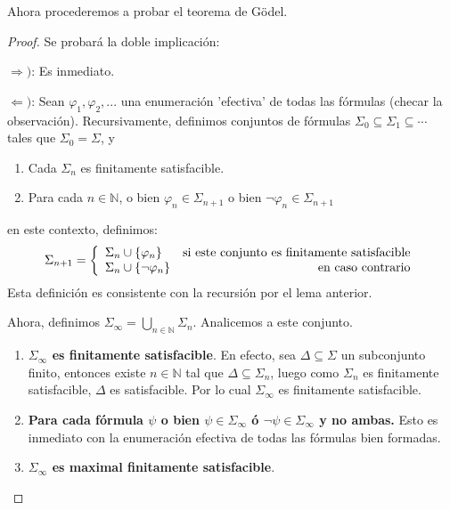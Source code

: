 \documentclass[12pt]{report}
\newcounter{it}
\theoremstyle{largebreak}
\begin{document}
    Ahora procederemos a probar el teorema de Gödel. 

    \begin{proof}
        Se probará la doble implicación:
        
        $\Rightarrow)$: Es inmediato.

        $\Leftarrow)$: Sean $\varphi_1,\varphi_2,...$ una enumeración 'efectiva' de todas las fórmulas (checar la observación). Recursivamente, definimos conjuntos de fórmulas $\Sigma_0\subseteq\Sigma_1\subseteq\cdots$ tales que $\Sigma_0=\Sigma$, y
        \begin{enumerate}
            \item Cada $\Sigma_n$ es finitamente satisfacible.
            \item Para cada $n\in\mathbb{N}$, o bien $\varphi_n\in\Sigma_{n+1}$ o bien $\neg\varphi_n\in\Sigma_{n+1}$
        \end{enumerate}
        en este contexto, definimos:
        \begin{equation*}
            \Sigma_{n+1}=\left\{\begin{array}{lr}
                    \Sigma_n\cup\left\{\varphi_n \right\} & \textup{si este conjunto es finitamente satisfacible}\\
                    \Sigma_n\cup\left\{\neg \varphi_n \right\} & \textup{en caso contrario}\\
                \end{array}
            \right.
        \end{equation*}
        Esta definición es consistente con la recursión por el lema anterior.

        Ahora, definimos $\Sigma_\infty=\bigcup_{n\in\mathbb{N}}\Sigma_n$. Analicemos a este conjunto.

        \begin{enumerate}
            \item \textbf{$\Sigma_\infty$ es finitamente satisfacible}. En efecto, sea $\Delta\subseteq\Sigma$ un subconjunto finito, entonces existe $n\in\mathbb{N}$ tal que $\Delta\subseteq\Sigma_n$, luego como $\Sigma_n$ es finitamente satisfacible, $\Delta$ es satisfacible. Por lo cual $\Sigma_\infty$ es finitamente satisfacible.
            \item \textbf{Para cada fórmula $\psi$ o bien $\psi\in\Sigma_\infty$ ó $\neg\psi\in\Sigma_\infty$ y no ambas.} Esto es inmediato con la enumeración efectiva de todas las fórmulas bien formadas.
            \item \textbf{$\Sigma_\infty$ es maximal finitamente satisfacible}.
        \end{enumerate}


\end{proof}
\end{document}
